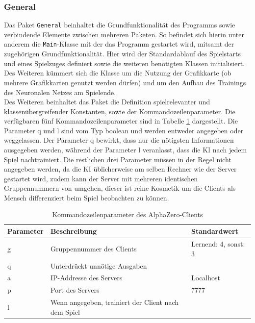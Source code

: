 \documentclass[12pt,a4paper]{article}
\begin{document}
\subsubsection{General}
Das Paket \texttt{General} beinhaltet die Grundfunktionalität des Programms sowie verbindende Elemente zwischen mehreren Paketen.
So befindet sich hierin unter anderem die \texttt{Main}-Klasse mit der das Programm gestartet wird, mitsamt der zugehörigen Grundfunktionalität. Hier wird der Standardablauf des Spielstarts und eines Spielzuges definiert sowie die weiteren benötigten Klassen initialisiert. Des Weiteren k\"{u}mmert sich die Klasse um die Nutzung der Grafikkarte (ob mehrere Grafikkarten genutzt werden d\"{u}rfen) und um den Aufbau des Trainings des Neuronalen Netzes am Spielende.\\
Des Weiteren beinhaltet das Paket die Definition spielrelevanter und klassenübergreifender Konstanten, sowie der Kommandozeilenparameter. Die verfügbaren fünf Kommandozeilenparameter sind in Tabelle \ref{tab:cmd_params} dargestellt. Die Parameter q und l sind vom Typ boolean und werden entweder angegeben oder weggelassen. Der Parameter q bewirkt, dass nur die nötigsten Informationen ausgegeben werden, während der Parameter l veranlasst, dass die KI nach jedem Spiel nachtrainiert. Die restlichen drei Parameter müssen in der Regel nicht angegeben werden, da die KI üblicherweise am selben Rechner wie der Server gestartet wird, zudem kann der Server mit mehreren identischen Gruppennummern von umgehen, dieser ist reine Kosmetik um die Clients als Mensch differenziert beim Spiel beobachten zu können.

\begin{table}[h]
	\caption{Kommandozeilenparameter des AlphaZero-Clients}
	\label{tab:cmd_params}
	\begin{tabularx}{\textwidth}{ | l | X | l | }
		\hline
		Parameter & Beschreibung & Standardwert \\ \hline
		g & Gruppennummer des Clients & Lernend: 4, sonst: 3 \\ \hline
		q & Unterdrückt unnötige Ausgaben &  \\ \hline
		a & IP-Addresse des Servers & Localhost  \\ \hline
		p & Port des Servers & 7777 \\ \hline
		l & Wenn angegeben, trainiert der Client nach dem Spiel &  \\ \hline
	\end{tabularx}
\end{table}
\end{document}
